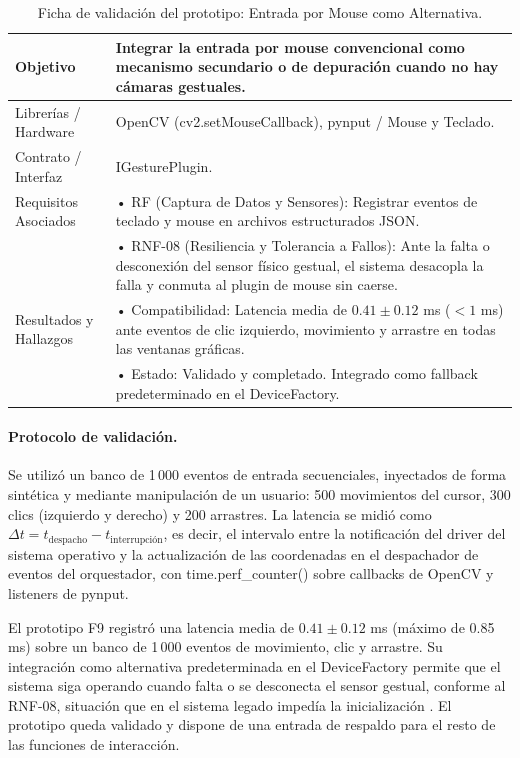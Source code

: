 \begin{table}[H]
    \centering
    \caption{Ficha de validación del prototipo: Entrada por Mouse como Alternativa.}
    \label{tab:ficha_f9}
    \begin{tabular}{L{3.2cm} L{11.0cm}}
        \toprule
        Objetivo & Integrar la entrada por mouse convencional como mecanismo secundario o de depuración cuando no hay cámaras gestuales. \\ \midrule
        Librerías / Hardware & OpenCV (cv2.setMouseCallback), pynput / Mouse y Teclado. \\ \midrule
        Contrato / Interfaz & IGesturePlugin. \\ \midrule
        Requisitos Asociados &
        • RF (Captura de Datos y Sensores): Registrar eventos de teclado y mouse en archivos estructurados JSON. \vspace{0.1cm} \\
        & • RNF-08 (Resiliencia y Tolerancia a Fallos): Ante la falta o desconexión del sensor físico gestual, el sistema desacopla la falla y conmuta al plugin de mouse sin caerse. \\ \midrule
        Resultados y Hallazgos &
        • Compatibilidad: Latencia media de $0.41 \pm 0.12$ ms ($<1$ ms) ante eventos de clic izquierdo, movimiento y arrastre en todas las ventanas gráficas. \vspace{0.1cm} \\
        & • Estado: Validado y completado. Integrado como fallback predeterminado en el DeviceFactory. \\ \bottomrule
    \end{tabular}
\end{table}
 
\paragraph{Protocolo de validación.} Se utilizó un banco de 1\,000 eventos de entrada secuenciales, inyectados de forma sintética y mediante manipulación de un usuario: 500 movimientos del cursor, 300 clics (izquierdo y derecho) y 200 arrastres. La latencia se midió como $\Delta t = t_{\mathrm{despacho}} - t_{\mathrm{interrupción}}$, es decir, el intervalo entre la notificación del driver del sistema operativo y la actualización de las coordenadas en el despachador de eventos del orquestador, con time.perf\_counter() sobre callbacks de OpenCV y listeners de pynput.
 
El prototipo F9 registró una latencia media de $0.41 \pm 0.12$ ms (máximo de 0.85 ms) sobre un banco de 1\,000 eventos de movimiento, clic y arrastre. Su integración como alternativa predeterminada en el DeviceFactory permite que el sistema siga operando cuando falta o se desconecta el sensor gestual, conforme al RNF-08, situación que en el sistema legado impedía la inicialización \citep{ibaceta2023evaluacion}. El prototipo queda validado y dispone de una entrada de respaldo para el resto de las funciones de interacción.
 
